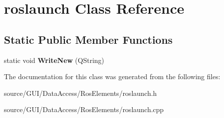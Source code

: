 \section{roslaunch Class Reference}
\label{classroslaunch}
\subsection*{Static Public Member Functions}
\begin{DoxyCompactItemize}
\item 
static void {\bfseries Write\+New} (Q\+String)\label{classroslaunch_a42a676907346810664406b2b9bf0c9f7}

\end{DoxyCompactItemize}


The documentation for this class was generated from the following files\+:\begin{DoxyCompactItemize}
\item 
source/\+G\+U\+I/\+Data\+Access/\+Ros\+Elements/roslaunch.\+h\item 
source/\+G\+U\+I/\+Data\+Access/\+Ros\+Elements/roslaunch.\+cpp\end{DoxyCompactItemize}
